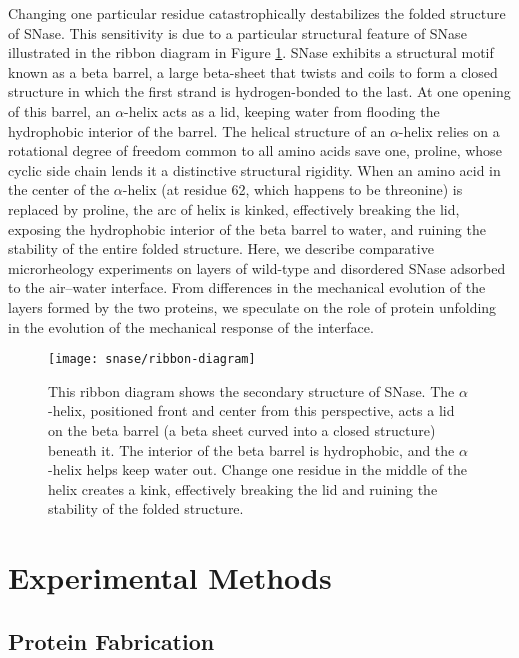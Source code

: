 Changing one particular residue catastrophically destabilizes the folded structure of SNase. This sensitivity is due to a particular structural feature of SNase illustrated in the ribbon diagram in Figure \ref{fig:ribbon-diagram}. SNase exhibits a structural motif known as a beta barrel, a large beta-sheet that twists and coils to form a closed structure in which the first strand is hydrogen-bonded to the last. At one opening of this barrel, an $\alpha$-helix acts as a lid, keeping water from flooding the hydrophobic interior of the barrel. The helical structure of an $\alpha$-helix relies on a rotational degree of freedom common to all amino acids save one, proline, whose cyclic side chain lends it a distinctive structural rigidity. When an amino acid in the center of the $\alpha$-helix (at residue 62, which happens to be threonine) is replaced by proline, the arc of helix is kinked, effectively breaking the lid, exposing the hydrophobic interior of the beta barrel to water, and ruining the stability of the entire folded structure. Here, we describe comparative microrheology experiments on layers of wild-type and disordered SNase adsorbed to the air--water interface. From differences in the mechanical evolution of the layers formed by the two proteins, we speculate on the role of protein unfolding in the evolution of the mechanical response of the interface.

\begin{figure}
 \texttt{[image: snase/ribbon-diagram]}
 \caption[Ribbon diagram of Wild-Type SNase]{\label{fig:ribbon-diagram}This ribbon diagram shows the secondary structure of SNase. The $\alpha$-helix, positioned front and center from this perspective, acts a lid on the beta barrel (a beta sheet curved into a closed structure) beneath it. The interior of the beta barrel is hydrophobic, and the $\alpha$-helix helps keep water out. Change one residue in the middle of the helix creates a kink, effectively breaking the lid and ruining the stability of the folded structure.}
\end{figure}

\section{Experimental Methods}

\subsection{Protein Fabrication}

